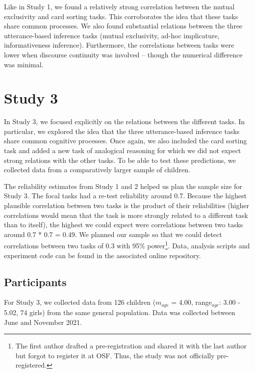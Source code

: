 \documentclass[
  english,
  man,floatsintext]{apa6}
\begin{document}
Like in Study 1, we found a relatively strong correlation between the mutual exclusivity and card sorting tasks. This corroborates the idea that these tasks share common processes. We also found substantial relations between the three utterance-based inference tasks (mutual exclusivity, ad-hoc implicature, informativeness inference). Furthermore, the correlations between tasks were lower when discourse continuity was involved -- though the numerical difference was minimal.

\hypertarget{study-3}{%
\section{Study 3}\label{study-3}}

In Study 3, we focused explicitly on the relations between the different tasks. In particular, we explored the idea that the three utterance-based inference tasks share common cognitive processes. Once again, we also included the card sorting task and added a new task of analogical reasoning for which we did not expect strong relations with the other tasks. To be able to test these predictions, we collected data from a comparatively larger sample of children.

The reliability estimates from Study 1 and 2 helped us plan the sample size for Study 3. The focal tasks had a re-test reliability around 0.7. Because the highest plausible correlation between two tasks is the product of their reliabilities (higher correlations would mean that the task is more strongly related to a different task than to itself), the highest we could expect were correlations between two tasks around 0.7 * 0.7 = 0.49. We planned our sample so that we could detect correlations between two tasks of 0.3 with 95\% power\footnote{The first author drafted a pre-registration and shared it with the last author but forgot to register it at OSF. Thus, the study was not officially pre-registered.}. Data, analysis scripts and experiment code can be found in the associated online repository.

\hypertarget{participants-2}{%
\subsection{Participants}\label{participants-2}}

For Study 3, we collected data from 126 children (\(m_{age}\) = 4.00, range\(_{age}\): 3.00 - 5.02, 74 girls) from the same general population. Data was collected between June and November 2021.
\end{document}
